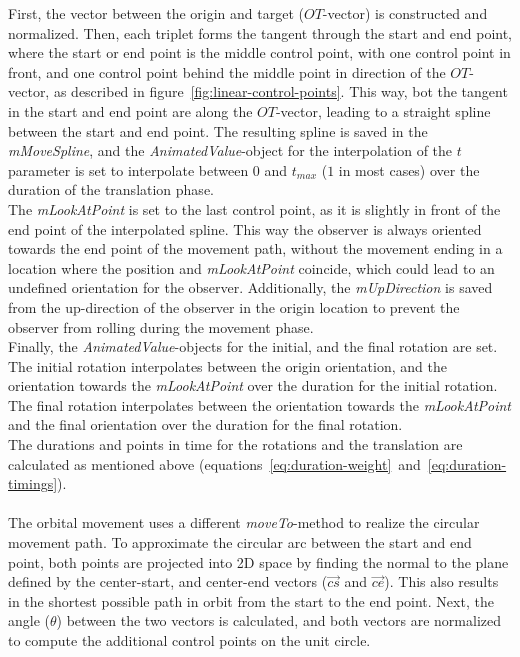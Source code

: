 First, the vector between the origin and target ($OT$-vector) is constructed and normalized.
Then, each triplet forms the tangent through the start and end point, where the start or end point is the middle
control point, with one control point in front, and one control point behind the middle point in direction of the
$OT$-vector, as described in figure~\ref{fig:linear-control-points}.
This way, bot the tangent in the start and end point are along the $OT$-vector, leading to a straight spline between
the start and end point.
The resulting spline is saved in the \textit{mMoveSpline}, and the \textit{AnimatedValue}-object for the
interpolation of the $t$ parameter is set to interpolate between $0$ and $t_{max}$ ($1$ in most cases) over the
duration of the translation phase.
\\
The \textit{mLookAtPoint} is set to the last control point, as it is slightly in front of the end point of the
interpolated spline.
This way the observer is always oriented towards the end point of the movement path, without the movement ending in a
location where the position and \textit{mLookAtPoint} coincide, which could lead to an undefined orientation for the
observer.
Additionally, the \textit{mUpDirection} is saved from the up-direction of the observer in the origin location to
prevent the observer from rolling during the movement phase.
\\
Finally, the \textit{AnimatedValue}-objects for the initial, and the final rotation are set.
The initial rotation interpolates between the origin orientation, and the orientation towards the
\textit{mLookAtPoint} over the duration for the initial rotation.
The final rotation interpolates between the orientation towards the \textit{mLookAtPoint} and the final orientation
over the duration for the final rotation.
\\
The durations and points in time for the rotations and the translation are calculated as mentioned above
(equations~\ref{eq:duration-weight}~and~\ref{eq:duration-timings}).
\\
\\
The orbital movement uses a different \textit{moveTo}-method to realize the circular movement path.
To approximate the circular arc between the start and end point, both points are projected into 2D space by finding
the normal to the plane defined by the center-start, and center-end vectors ($\overrightarrow{cs}$ and
$\overrightarrow{ce}$).
This also results in the shortest possible path in orbit from the start to the end point.
Next, the angle ($\theta$) between the two vectors is calculated, and both vectors are normalized to compute the
additional control points on the unit circle.

